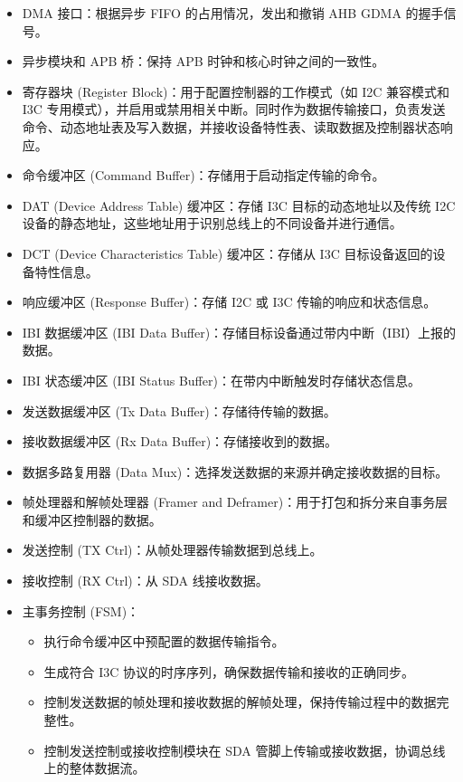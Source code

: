 \documentclass[main\_\_CN.tex]{subfiles}
\begin{document}
\begin{itemize}
    \item DMA 接口：根据异步 FIFO 的占用情况，发出和撤销 AHB GDMA 的握手信号。
    \item 异步模块和 APB 桥：保持 APB 时钟和核心时钟之间的一致性。
    \item 寄存器块 (Register Block)：用于配置控制器的工作模式（如 I2C 兼容模式和 I3C 专用模式），并启用或禁用相关中断。同时作为数据传输接口，负责发送命令、动态地址表及写入数据，并接收设备特性表、读取数据及控制器状态响应。
    \item 命令缓冲区 (Command Buffer)：存储用于启动指定传输的命令。
    \item DAT (Device Address Table) 缓冲区：存储 I3C 目标的动态地址以及传统 I2C 设备的静态地址，这些地址用于识别总线上的不同设备并进行通信。
    \item DCT (Device Characteristics Table) 缓冲区：存储从 I3C 目标设备返回的设备特性信息。
    \item 响应缓冲区 (Response Buffer)：存储 I2C 或 I3C 传输的响应和状态信息。
    \item IBI 数据缓冲区 (IBI Data Buffer)：存储目标设备通过带内中断（IBI）上报的数据。
    \item IBI 状态缓冲区 (IBI Status Buffer)：在带内中断触发时存储状态信息。
    \item 发送数据缓冲区 (Tx Data Buffer)：存储待传输的数据。
    \item 接收数据缓冲区 (Rx Data Buffer)：存储接收到的数据。
    \item 数据多路复用器 (Data Mux)：选择发送数据的来源并确定接收数据的目标。
    \item 帧处理器和解帧处理器 (Framer and Deframer)：用于打包和拆分来自事务层和缓冲区控制器的数据。
    \item 发送控制 (TX Ctrl)：从帧处理器传输数据到总线上。
    \item 接收控制 (RX Ctrl)：从 SDA 线接收数据。
    \item 主事务控制 (FSM)：
    \begin{itemize}
      \item 执行命令缓冲区中预配置的数据传输指令。
      \item 生成符合 I3C 协议的时序序列，确保数据传输和接收的正确同步。
      \item 控制发送数据的帧处理和接收数据的解帧处理，保持传输过程中的数据完整性。
      \item 控制发送控制或接收控制模块在 SDA 管脚上传输或接收数据，协调总线上的整体数据流。
    \end{itemize}
\end{itemize}
\end{document}

